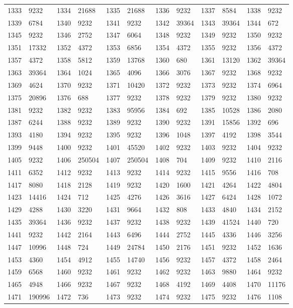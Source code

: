 \begin{longtable}{llllllllllll}
1333 & 9232&1334 &21688&1335& 21688&1336 &9232&1337 &8584&1338& 9232\\
1339 & 6784&1340 &9232&1341& 9232&1342 &39364&1343 &39364&1344& 672\\
1345 & 9232&1346 &2752&1347& 6064&1348 &9232&1349 &9232&1350& 9232\\
1351 & 17332&1352 &4372&1353& 6856&1354 &4372&1355 &9232&1356& 4372\\
1357 & 4372&1358 &5812&1359& 13768&1360 &680&1361 &13120&1362& 39364\\
1363 & 39364&1364 &1024&1365& 4096&1366 &3076&1367 &9232&1368& 9232\\
1369 & 4624&1370 &9232&1371& 10420&1372 &9232&1373 &9232&1374& 6964\\
1375 & 20896&1376 &688&1377& 9232&1378 &9232&1379 &9232&1380& 9232\\
1381 & 9232&1382 &9232&1383& 95956&1384 &692&1385 &10528&1386& 2080\\
1387 & 6244&1388 &9232&1389& 9232&1390 &9232&1391 &15856&1392& 696\\
1393 & 4180&1394 &9232&1395& 9232&1396 &1048&1397 &4192&1398& 3544\\
1399 & 9448&1400 &9232&1401& 45520&1402 &9232&1403 &9232&1404& 9232\\
1405 & 9232&1406 &250504&1407& 250504&1408 &704&1409 &9232&1410& 2116\\
1411 & 6352&1412 &9232&1413& 9232&1414 &9232&1415 &9556&1416& 708\\
1417 & 8080&1418 &2128&1419& 9232&1420 &1600&1421 &4264&1422& 4804\\
1423 & 14416&1424 &712&1425& 4276&1426 &3616&1427 &6424&1428& 1072\\
1429 & 4288&1430 &3220&1431& 9664&1432 &808&1433 &4840&1434& 2152\\
1435 & 39364&1436 &9232&1437& 9232&1438 &9232&1439 &41524&1440& 720\\
1441 & 9232&1442 &2164&1443& 6496&1444 &2752&1445 &4336&1446& 3256\\
1447 & 10996&1448 &724&1449& 24784&1450 &2176&1451 &9232&1452& 1636\\
1453 & 4360&1454 &4912&1455& 14740&1456 &9232&1457 &4372&1458& 2464\\
1459 & 6568&1460 &9232&1461& 9232&1462 &9232&1463 &9880&1464& 9232\\
1465 & 4948&1466 &9232&1467& 9232&1468 &4192&1469 &4408&1470& 11176\\
1471 & 190996&1472 &736&1473& 9232&1474 &9232&1475 &9232&1476& 1108\\

\end{longtable}
